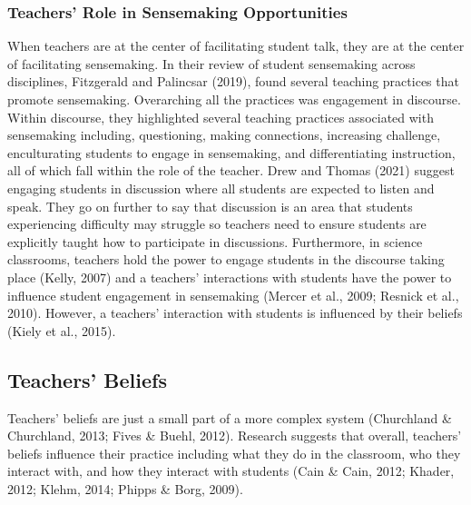 \documentclass{sig-alternate} %
\begin{document}
\begin{large}
\subsubsection*{Teachers’ Role in Sensemaking Opportunities}

When teachers are at the center of facilitating student talk, they are at the center of facilitating sensemaking. In their review of student sensemaking across disciplines, Fitzgerald and Palincsar (2019), found several teaching practices that promote sensemaking. Overarching all the practices was engagement in discourse. Within discourse, they highlighted several teaching practices associated with sensemaking including, questioning, making connections, increasing challenge, enculturating students to engage in sensemaking, and differentiating instruction, all of which fall within the role of the teacher. Drew and Thomas (2021) suggest engaging students in discussion where all students are expected to listen and speak. They go on further to say that discussion is an area that students experiencing difficulty may struggle so teachers need to ensure students are explicitly taught how to participate in discussions. Furthermore, in science classrooms, teachers hold the power to engage students in the discourse taking place (Kelly, 2007) and a teachers’ interactions with students have the power to influence student engagement in sensemaking (Mercer et al., 2009; Resnick et al., 2010). However, a teachers’ interaction with students is influenced by their beliefs (Kiely et al., 2015).

\subsection*{Teachers’ Beliefs}

Teachers’ beliefs are just a small part of a more complex system (Churchland \& Churchland, 2013; Fives \& Buehl, 2012). Research suggests that overall, teachers’ beliefs influence their practice including what they do in the classroom, who they interact with, and how they interact with students (Cain \& Cain, 2012; Khader, 2012; Klehm, 2014; Phipps \& Borg, 2009).


\end{large}
\end{document}

